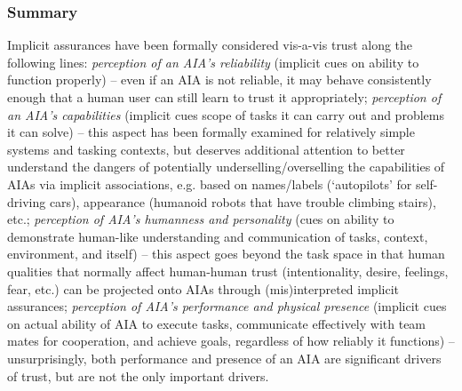 \subsubsection{Summary}
Implicit assurances have been formally considered vis-a-vis trust along the following lines:
\textit{perception of an AIA's reliability} (implicit cues on ability to function properly) -- even if an AIA is not reliable, it may behave consistently enough that a human user can still learn to trust it appropriately; 
\textit{perception of an AIA's capabilities} (implicit cues scope of tasks it can carry out and problems it can solve) -- this aspect has  been formally examined for relatively simple systems and tasking contexts, but deserves additional attention to better understand the dangers of potentially underselling/overselling the capabilities of AIAs via implicit associations, e.g. based on names/labels (`autopilots' for self-driving cars), appearance (humanoid robots that have trouble climbing stairs), etc.; 
\textit{perception of AIA's humanness and personality} (cues on ability to demonstrate human-like understanding and communication of tasks, context, environment, and itself) -- this aspect goes beyond the task space in that human qualities that normally affect human-human trust (intentionality, desire, feelings, fear, etc.) can be projected onto AIAs through (mis)interpreted implicit assurances; 
\textit{perception of AIA's performance and physical presence} (implicit cues on actual ability of AIA to execute tasks, communicate effectively with team mates for cooperation, and achieve goals, regardless of how reliably it functions) -- unsurprisingly, both performance and presence of an AIA are significant drivers of trust, but are not the only important drivers. 
